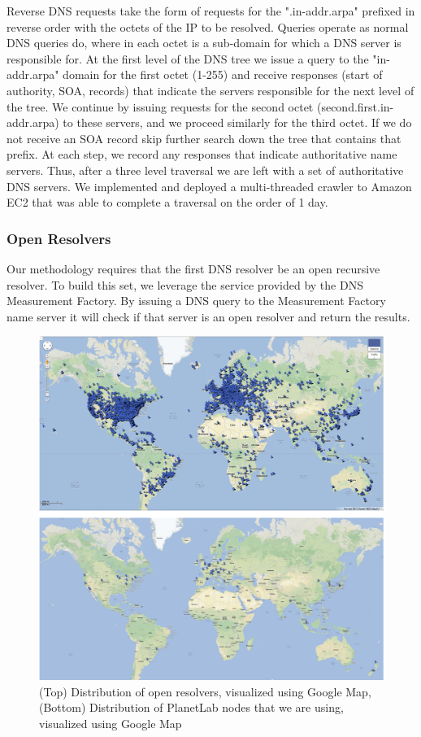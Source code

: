 Reverse DNS requests take the form of requests for the ".in-addr.arpa" prefixed in reverse order with the octets of the IP to be resolved. Queries operate as normal DNS queries do, where in each octet is a sub-domain for which a DNS server is responsible for.
At the first level of the DNS tree we issue a query to the "in-addr.arpa" domain for the first octet (1-255) and receive responses (start of authority, SOA, records) that indicate the servers responsible for the next level of the tree. We continue by issuing requests for the second octet (second.first.in-addr.arpa) to these servers, and we proceed similarly for the third octet. If we do not receive an SOA record skip further search down the tree that contains that prefix. At each step, we record any responses that indicate authoritative name servers. Thus, after a three level traversal we are left with a set of authoritative DNS servers. We implemented and deployed a multi-threaded crawler to Amazon EC2 that was able to complete a traversal on the order of 1 day.

\subsubsection{Open Resolvers}
Our methodology requires that the first DNS resolver be an open recursive resolver. To build this set, we leverage the service provided by the DNS Measurement Factory. By issuing a DNS query to the Measurement Factory name server it will check if that server is an open resolver and return the results.\cite{dnsfactory}

\begin{figure}
  \centering
  \includegraphics[width=\linewidth]{../figs/geo_viz.pdf}
  \caption{(Top) Distribution of open resolvers, visualized using Google Map, (Bottom) Distribution of PlanetLab nodes that we are using, visualized using Google Map}
  \label{fig:geo_viz}
\end{figure}


